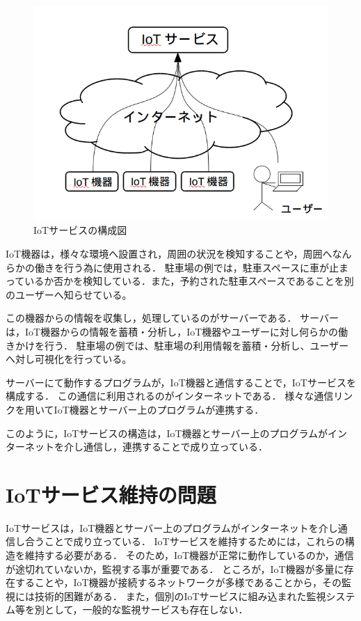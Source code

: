 \begin{figure}[htbp]
\includegraphics[width=16cm]{images/IoTservice.png}
\caption{IoTサービスの構成図}
\label{fig:IoTservice}
\end{figure}

IoT機器は，様々な環境へ設置され，周囲の状況を検知することや，周囲へなんらかの働きを行う為に使用される．
駐車場の例では，駐車スペースに車が止まっているか否かを検知している．また，予約された駐車スペースであることを別のユーザーへ知らせている。
\medskip

この機器からの情報を収集し，処理しているのがサーバーである．
サーバーは，IoT機器からの情報を蓄積・分析し，IoT機器やユーザーに対し何らかの働きかけを行う．
駐車場の例では、駐車場の利用情報を蓄積・分析し、ユーザーへ対し可視化を行っている。
\medskip

サーバーにて動作するプログラムが，IoT機器と通信することで，IoTサービスを構成する．
この通信に利用されるのがインターネットである．
様々な通信リンクを用いてIoT機器とサーバー上のプログラムが連携する．
\medskip

このように，IoTサービスの構造は，IoT機器とサーバー上のプログラムがインターネットを介し通信し，連携することで成り立っている．

\section{IoTサービス維持の問題}
IoTサービスは，IoT機器とサーバー上のプログラムがインターネットを介し通信し合うことで成り立っている．
IoTサービスを維持するためには，これらの構造を維持する必要がある．
そのため，IoT機器が正常に動作しているのか，通信が途切れていないか，監視する事が重要である．
ところが，IoT機器が多量に存在することや，IoT機器が接続するネットワークが多様であることから，その監視には技術的困難がある．
また，個別のIoTサービスに組み込まれた監視システム等を別として，一般的な監視サービスも存在しない．
\medskip

